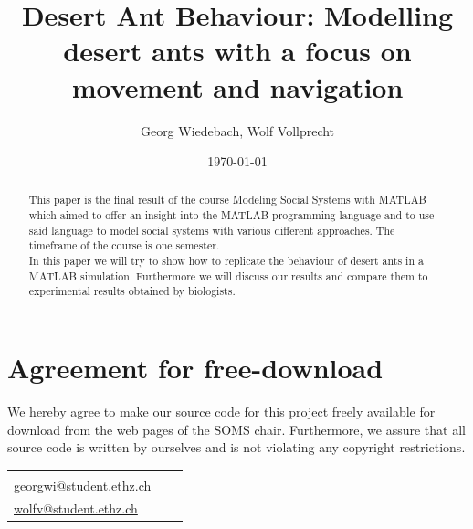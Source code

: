 \documentclass[11pt]{article}
\title{Desert Ant Behaviour: Modelling desert ants with a focus on movement and navigation}
\author{Georg Wiedebach, Wolf Vollprecht}
\date{\today}
\begin{document}

\newpage


\newpage
\section*{Agreement for free-download}
\bigskip


\bigskip


\large We hereby agree to make our source code for this project freely available for download from the web pages of the SOMS chair. Furthermore, we assure that all source code is written by ourselves and is not violating any copyright restrictions.

\begin{center}

\bigskip


\bigskip


\begin{tabular}{@{}p{3.3cm}@{}p{6cm}@{}@{}p{6cm}@{}}
\begin{minipage}{3cm}

\end{minipage}
&
\begin{minipage}{6cm}
 \large Georg Wiedebach\\
 \href{mailto:georgwi@student.ethz.ch}{georgwi@student.ethz.ch}
\end{minipage}
&
\begin{minipage}{6cm}

\large Wolf Vollprecht\\
\href{mailto:wolfv@student.ethz.ch}{wolfv@student.ethz.ch}

\end{minipage}
\end{tabular}


\end{center}
\newpage





\begin{abstract}
This paper is the final result of the course {\sc Modeling Social Systems with MATLAB} which aimed to offer an insight into the MATLAB programming language and to use said language to model social systems with various different approaches. The timeframe of the course is one semester. \\
In this paper we will try to show how to replicate the behaviour of desert ants in a MATLAB simulation. Furthermore we will discuss our results and compare them to experimental results obtained by biologists.
\end{abstract}
\end{document}

